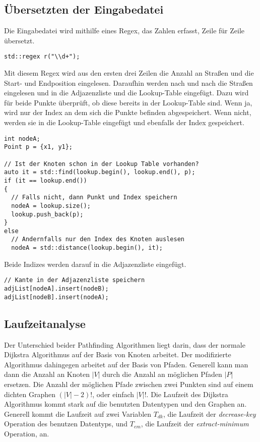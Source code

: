 \documentclass[a4paper,10pt,ngerman]{scrartcl}
\begin{document}
\subsection{Übersetzten der Eingabedatei}
Die Eingabedatei wird mithilfe eines Regex, das Zahlen erfasst, Zeile für Zeile übersetzt.

\begin{lstlisting}[frame=single]
std::regex r("\\d+");
\end{lstlisting}

Mit diesem Regex wird aus den ersten drei Zeilen die Anzahl an Straßen und die Start- und Endposition eingelesen.
Daraufhin werden nach und nach die Straßen eingelesen und in die Adjazenzliste und die Lookup-Table eingefügt.
Dazu wird für beide Punkte überprüft, ob diese bereits in der Lookup-Table sind. Wenn ja, wird nur der Index an dem sich die Punkte befinden abgespeichert.
Wenn nicht, werden sie in die Lookup-Table eingefügt und ebenfalls der Index gespeichert.

\begin{lstlisting}[frame=single]
int nodeA;
Point p = {x1, y1};

// Ist der Knoten schon in der Lookup Table vorhanden?
auto it = std::find(lookup.begin(), lookup.end(), p);
if (it == lookup.end())
{
  // Falls nicht, dann Punkt und Index speichern
  nodeA = lookup.size();
  lookup.push_back(p);
}
else
  // Andernfalls nur den Index des Knoten auslesen
  nodeA = std::distance(lookup.begin(), it);
\end{lstlisting}

Beide Indizes werden darauf in die Adjazenzliste eingefügt.

\begin{lstlisting}[frame=single]
// Kante in der Adjazenzliste speichern
adjList[nodeA].insert(nodeB);
adjList[nodeB].insert(nodeA);
\end{lstlisting}

\subsection{Laufzeitanalyse}
Der Unterschied beider Pathfinding Algorithmen liegt darin, dass der normale Dijkstra Algorithmus auf der Basis von Knoten arbeitet.
Der modifizierte Algorithmus dahingegen arbeitet auf der Basis von Pfaden.
Generell kann man dann die Anzahl an Knoten $|V|$ durch die Anzahl an möglichen Pfaden $|P|$ ersetzen.
Die Anzahl der möglichen Pfade zwischen zwei Punkten sind auf einem dichten Graphen $(|V| - 2)!$, oder einfach $|V|!$.
Die Laufzeit des Dijkstra Algorithmus kommt stark auf die benutzten Datentypen und den Graphen an. Generell kommt die Laufzeit auf zwei Variablen
$T_{dk}$, die Laufzeit der \textit{decrease-key} Operation des benutzen Datentyps, und $T_{em}$, die Laufzeit der \textit{extract-minimum} Operation, an.
\end{document}
